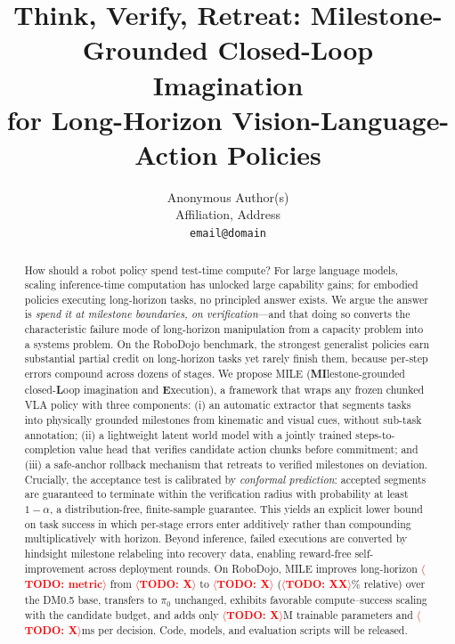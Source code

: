 \documentclass{article}
\title{Think, Verify, Retreat: Milestone-Grounded Closed-Loop Imagination\\
for Long-Horizon Vision-Language-Action Policies}
\author{Anonymous Author(s)\\Affiliation, Address\\\texttt{email@domain}}
\date{}
\newcommand{\mile}{\textsc{MILE}}
\newcommand{\TODO}[1]{\textcolor{red}{\textbf{$\langle$TODO: #1$\rangle$}}}
\begin{document}
\maketitle

\begin{abstract}
How should a robot policy spend test-time compute? For large language models, scaling inference-time computation has unlocked large capability gains; for embodied policies executing long-horizon tasks, no principled answer exists. We argue the answer is \emph{spend it at milestone boundaries, on verification}---and that doing so converts the characteristic failure mode of long-horizon manipulation from a capacity problem into a systems problem. On the RoboDojo benchmark, the strongest generalist policies earn substantial partial credit on long-horizon tasks yet rarely finish them, because per-step errors compound across dozens of stages. We propose \mile{} (\textbf{MI}lestone-grounded closed-\textbf{L}oop imagination and \textbf{E}xecution), a framework that wraps any frozen chunked VLA policy with three components: (i) an automatic extractor that segments tasks into physically grounded milestones from kinematic and visual cues, without sub-task annotation; (ii) a lightweight latent world model with a jointly trained steps-to-completion value head that verifies candidate action chunks before commitment; and (iii) a safe-anchor rollback mechanism that retreats to verified milestones on deviation. Crucially, the acceptance test is calibrated by \emph{conformal prediction}: accepted segments are guaranteed to terminate within the verification radius with probability at least $1-\alpha$, a distribution-free, finite-sample guarantee. This yields an explicit lower bound on task success in which per-stage errors enter additively rather than compounding multiplicatively with horizon. Beyond inference, failed executions are converted by hindsight milestone relabeling into recovery data, enabling reward-free self-improvement across deployment rounds. On RoboDojo, \mile{} improves long-horizon \TODO{metric} from \TODO{X} to \TODO{X} (\TODO{XX}\% relative) over the DM0.5 base, transfers to $\pi_0$ unchanged, exhibits favorable compute--success scaling with the candidate budget, and adds only \TODO{X}M trainable parameters and \TODO{X}ms per decision. Code, models, and evaluation scripts will be released.
\end{abstract}

\end{document}
